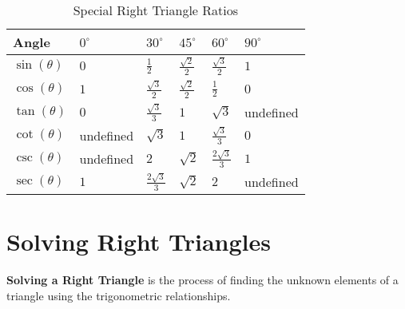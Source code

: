 \begin{table}[htpb]
	\centering

	\begin{tabular}{llllll}
		\hline
		\textbf{Angle} & $0^{\circ}$       & $30^{\circ}$                        & $45^{\circ}$                       & $60^{\circ}$                        & $90^{\circ}$      \\
		\hline
		$\sin(\theta)$ & $\displaystyle 0$ & $\displaystyle \frac{1}{2}$         & $\displaystyle \frac{\sqrt{2}}{2}$ & $\displaystyle \frac{\sqrt{3}}{2}$  & $\displaystyle 1$ \\
		$\cos(\theta)$ & $\displaystyle 1$ & $\displaystyle \frac{\sqrt{3}}{2}$  & $\displaystyle \frac{\sqrt{2}}{2}$ & $\displaystyle \frac{1}{2}$         & $\displaystyle 0$ \\
		$\tan(\theta)$ & $\displaystyle 0$ & $\displaystyle \frac{\sqrt{3}}{3}$  & $\displaystyle 1$                  & $\displaystyle \sqrt{3}$            & undefined         \\
		$\cot(\theta)$ & undefined         & $\displaystyle \sqrt{3}$            & $\displaystyle 1$                  & $\displaystyle \frac{\sqrt{3}}{3}$  & $\displaystyle 0$ \\
		$\csc(\theta)$ & undefined         & $\displaystyle 2$                   & $\displaystyle \sqrt{2}$           & $\displaystyle \frac{2\sqrt{3}}{3}$ & $\displaystyle 1$ \\
		$\sec(\theta)$ & $\displaystyle 1$ & $\displaystyle \frac{2\sqrt{3}}{3}$ & $\displaystyle \sqrt{2}$           & $\displaystyle 2$                   & undefined         \\
		\hline
	\end{tabular}

	\caption{Special Right Triangle Ratios}
	\label{tab:special_right_triangle_ratios}
\end{table}


\section{Solving Right Triangles}
\label{sec:solving_right_triangles}

\begin{definition}
  \label{def:solving_a_right_triangle}

  \textbf{Solving a Right Triangle} is the process of finding the unknown
  elements of a triangle using the trigonometric relationships.
\end{definition}

